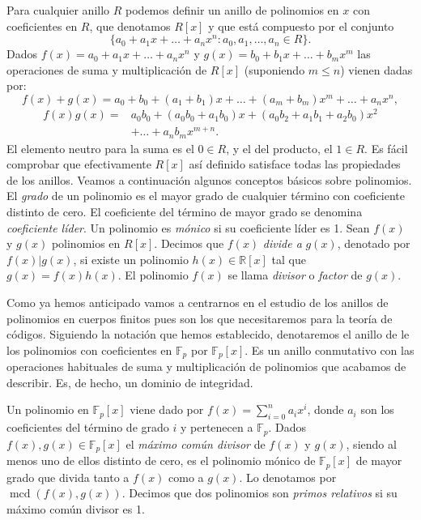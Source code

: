 Para cualquier anillo \(R\) podemos definir un anillo de polinomios en \(x\) con coeficientes en \(R\), que denotamos \(R[x]\) y que está compuesto por el conjunto
\[
  \{a_0 + a_1x + \dots + a_nx^n : a_0, a_1, \dots, a_n \in R\}.
\]
Dados \(f(x) = a_0 + a_1x + \dots + a_nx^n\) y \(g(x) = b_0 + b_1x + \dots + b_mx^m\) las operaciones de suma y multiplicación de \(R[x]\) (suponiendo \(m \leq n\)) vienen dadas por:
\[
  f(x) + g(x) = a_0 + b_0 + (a_1 + b_1)x + \dots + (a_m + b_m)x^m + \dots + a_nx^n,
\]
\begin{align*}
  f(x)g(x) = &a_0b_0 + (a_0b_0 + a_1b_0)x + (a_0b_2 + a_1b_1 + a_2b_0)x^2\\
    &+ \dots + a_nb_mx^{m+n}.
\end{align*}
El elemento neutro para la suma es el \(0 \in R\), y el del producto, el \(1 \in R\).
Es fácil comprobar que efectivamente \(R[x]\) así definido satisface todas las propiedades de los anillos.
Veamos a continuación algunos conceptos básicos sobre polinomios.
El \textit{grado} de un polinomio es el mayor grado de cualquier término con coeficiente distinto de cero.
El coeficiente del término de mayor grado se denomina \textit{coeficiente líder}.
Un polinomio es \textit{mónico} si su coeficiente líder es 1.
Sean \(f(x)\) y \(g(x)\) polinomios en \(R[x]\).
Decimos que \(f(x)\) \textit{divide a} \(g(x)\), denotado por \(f(x) | g(x)\), si existe un polinomio \(h(x) \in \mathbb R[x]\) tal que \(g(x) = f(x)h(x)\).
El polinomio \(f(x)\) se llama \textit{divisor} o \textit{factor} de \(g(x)\).

Como ya hemos anticipado vamos a centrarnos en el estudio de los anillos de polinomios en cuerpos finitos pues son los que necesitaremos para la teoría de códigos.
Siguiendo la notación que hemos establecido, denotaremos el anillo de le los polinomios con coeficientes en \(\mathbb F_p\) por \(\mathbb F_p[x]\).
Es un anillo conmutativo con las operaciones habituales de suma y multiplicación de polinomios que acabamos de describir.
Es, de hecho, un dominio de integridad.

Un polinomio en \(\mathbb F_p[x]\) viene dado por \(f(x) = \sum_{i=0}^n a_ix^i\), donde \(a_i\) son los coeficientes del término de grado \(i\) y pertenecen a \(\mathbb F_p\).
Dados \(f(x), g(x) \in \mathbb F_p[x]\) el \textit{máximo común divisor} de \(f(x)\) y \(g(x)\), siendo al menos uno de ellos distinto de cero, es el polinomio mónico de \(\mathbb F_p[x]\) de mayor grado que divida tanto a \(f(x)\) como a \(g(x)\).
Lo denotamos por \(\operatorname{mcd}(f(x), g(x))\).
Decimos que dos polinomios son \textit{primos relativos} si su máximo común divisor es 1.


